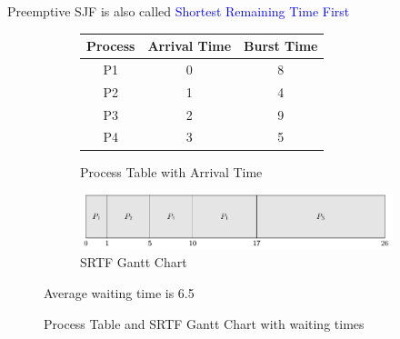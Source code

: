 \documentclass{book/custombook}
\begin{document}
                Preemptive SJF is also called \textcolor{blue}{Shortest Remaining Time First}
                \begin{figure}[H]
                    \centering
                    \begin{subfigure}{0.5\linewidth}
                        \begin{tabular}{ccc}
                            Process & Arrival Time & Burst Time\\
                            \toprule
                            P1 & 0 & 8\\
                            P2 & 1 & 4\\
                            P3 & 2 & 9\\
                            P4 & 3 & 5\\
                        \end{tabular}
                        \caption{Process Table with Arrival Time}
                    \end{subfigure}%
                    \begin{subfigure}{0.5\linewidth}
                        \centering
                        \includegraphics[width=\linewidth]{figures/srtf_gantt_1.pdf}
                        \caption{SRTF Gantt Chart}
                    \end{subfigure}
                    Average waiting time is 6.5
                    \caption{Process Table and SRTF Gantt Chart with waiting times}
                \end{figure}
\end{document}

